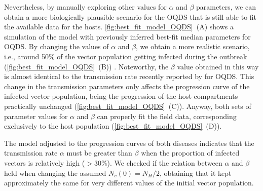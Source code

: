 Nevertheless, by manually exploring other values for $\alpha$ and $\beta$
parameters, we can obtain a more biologically plausible scenario for the OQDS
that is still able to fit the available data for the hosts.
\cref{fig:best_fit_model_OQDS}~\textcolor{ref_color}{(A)} shows a simulation of
the model with
previously inferred best-fit median parameters for OQDS. By changing the values
of $\alpha$ and $\beta$, we obtain a more realistic scenario, i.e., around
50\% of the vector population getting infected during the outbreak
(\cref{fig:best_fit_model_OQDS}~\textcolor{ref_color}{(B)})
\cite{Cavalieri2019,
    cornara2017transmission}. Noteworthy, the $\beta$ value obtained in this
way
is almost identical to the transmission rate recently reported by
\cite{Bodino2021} for OQDS. This change in the transmission parameters only
affects the progression curve of the infected vector population, being the
progression of the host compartments practically unchanged
(\cref{fig:best_fit_model_OQDS}~\textcolor{ref_color}{(C)}). Anyway, both sets
of parameter values for
$\alpha$ and $\beta$ can properly fit the field data, corresponding exclusively
to the	host population
(\cref{fig:best_fit_model_OQDS}~\textcolor{ref_color}{(D)}).

The model adjusted to the progression curves of both diseases indicates
that the transmission rate $\alpha$ must be greater than $\beta$ when the
proportion of infected vectors is relatively high ($>30\%$). We checked if the
relation between $\alpha$ and $\beta$ held when changing the assumed
$N_v(0)=N_H/2$, obtaining that it kept approximately the same for very
different values of the initial vector population.

